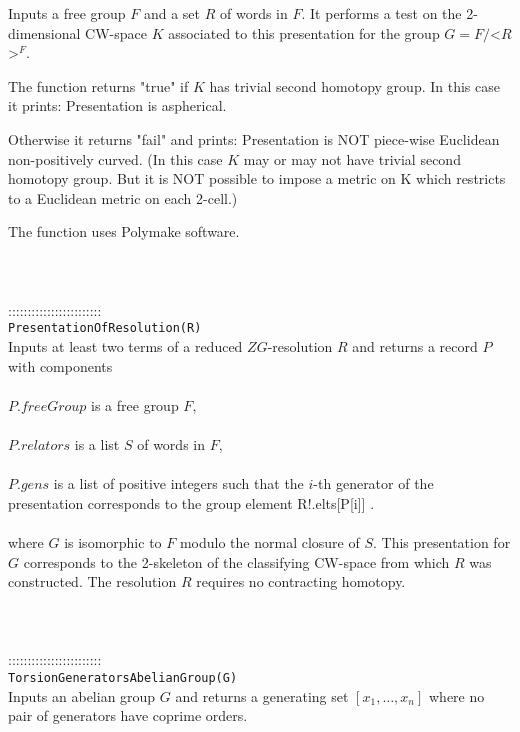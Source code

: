 \documentclass[a4paper,11pt]{report}
\begin{document}
{ Inputs a free group $F$ and a set $R$ of words in $F$. It performs a test on the 2-dimensional CW-space $K$ associated to this presentation for the group $G=F/${\textless}$R${\textgreater}$^F$. 

 The function returns "true" if $K$ has trivial second homotopy group. In this case it prints: Presentation is
aspherical. 

 Otherwise it returns "fail" and prints: Presentation is NOT piece-wise
Euclidean non-positively curved. (In this case $K$ may or may not have trivial second homotopy group. But it is NOT possible to
impose a metric on K which restricts to a Euclidean metric on each 2-cell.) 

 The function uses Polymake software. \\
 \\
 \\
 \\
 ::::::::::::::::::::::::\\
 \texttt{PresentationOfResolution(R) }\\
 

 Inputs at least two terms of a reduced $ZG$-resolution $R$ and returns a record $P$ with components \\
 \\
 $P.freeGroup$ is a free group $F$, \\
 \\
 $P.relators$ is a list $S$ of words in $F$, \\
 \\
 $P.gens$ is a list of positive integers such that the $i$-th generator of the presentation corresponds to the group element
R!.elts[P[i]] . \\
 \\
 where $G$ is isomorphic to $F$ modulo the normal closure of $S$. This presentation for $G$ corresponds to the 2-skeleton of the classifying CW-space from which $R$ was constructed. The resolution $R$ requires no contracting homotopy. \\
 \\
 \\
 \\
 ::::::::::::::::::::::::\\
 \texttt{TorsionGeneratorsAbelianGroup(G) }\\
 

 Inputs an abelian group $G$ and returns a generating set $[x_1, \ldots ,x_n]$ where no pair of generators have coprime orders. \\
 \\
 \\
 }
\end{document}

